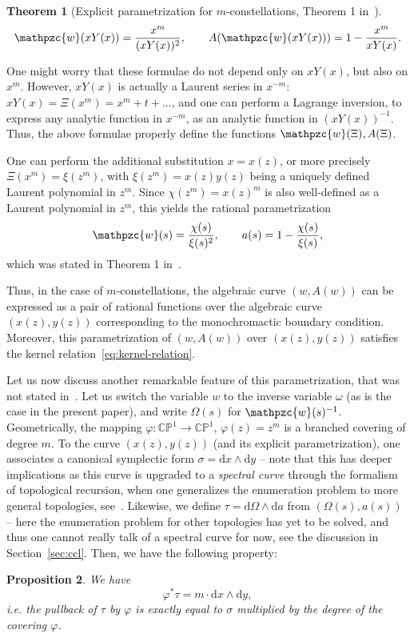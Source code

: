 \documentclass{scrartcl}
\newcommand{\C}{\mathbb{C}}
\renewcommand{\P}{\mathbb{P}}
\newcommand{\dinf}{\mathrm{d}}
\newtheorem{thm}{Theorem}[section]
\newtheorem{prop}[thm]{Proposition}
\begin{document}
\begin{thm}[Explicit parametrization for $m$-constellations, Theorem 1 in~\cite{bouttier-carrance}]
\[
\mathpzc{w}(xY(x))=\frac{x^{m}}{(xY(x))^2}, \qquad A(\mathpzc{w}(xY(x)))=1-\frac{x^m}{xY(x)}.
\]
\end{thm}

One might worry that these formulae do not depend only on $xY(x)$, but also on $x^m$. However, $xY(x)$ is actually a Laurent series in $x^{-m}$: $xY(x)=\Xi(x^m)=x^m +t+...$, and one can perform a Lagrange inversion, to express any analytic function in $x^{-m}$, as an analytic function in $(xY(x))^{-1}$. Thus, the above formulae properly define the functions $\mathpzc{w}(\Xi), A(\Xi)$.

One can perform the additional substitution $x=x(z)$, or more precisely $\Xi(x^m)=\xi(z^m)$, with $\xi(z^m)=x(z)y(z)$ being a uniquely defined Laurent polynomial in $z^m$. Since $\chi(z^m)=x(z)^m$ is also well-defined as a Laurent polynomial in $z^m$, this yields the rational parametrization
\begin{equation}
\mathpzc{w}(s)=\frac{\chi(s)}{\xi(s)^2}, \qquad a(s)=1-\frac{\chi(s)}{\xi(s)},
\label{eq:const-param-ratio-s}
\end{equation}
which was stated in Theorem 1 in~\cite{bouttier-carrance}.

Thus, in the case of $m$-constellations, the algebraic curve $(w,A(w))$ can be expressed as a pair of rational functions over the algebraic curve $(x(z),y(z))$ corresponding to the monochromactic boundary condition. Moreover, this parametrization of $(w,A(w))$ over $(x(z),y(z))$ satisfies the kernel relation~\eqref{eq:kernel-relation}.

Let us now discuss another remarkable feature of this parametrization, that was not stated in~\cite{bouttier-carrance}. Let us switch the variable $w$ to the inverse variable $\omega$ (as is the case in the present paper), and write $\Omega(s)$ for $\mathpzc{w}(s)^{-1}$. Geometrically, the mapping $\varphi: \C\P^1 \to \C\P^1$, $\varphi(z)=z^m$ is a branched covering of degree $m$. To the curve $(x(z),y(z))$ (and its explicit parametrization), one associates a canonical symplectic form $\sigma=\dinf x\wedge \dinf y$  -- note that this has deeper implications as this curve is upgraded to a \emph{spectral curve} through the formalism of topological recursion, when one generalizes the enumeration problem to more general topologies, see~\cite{eynard}. Likewise, we define $\tau=\dinf\Omega\wedge\dinf a$ from $(\Omega(s),a(s))$ --  here the enumeration problem for other topologies has yet to be solved, and thus one cannot really talk of a spectral curve for now, see the discussion in Section~\ref{sec:ccl}. Then, we have the following property:
\begin{prop}
We have
\[
\varphi^*\tau=m\cdot \dinf x \wedge \dinf y,
\]
i.e. the pullback of $\tau$ by $\varphi$ is exactly equal to $\sigma$ multiplied by the degree of the covering $\varphi$.
\label{prop:sympl-nice}
\end{prop}
\end{document}
